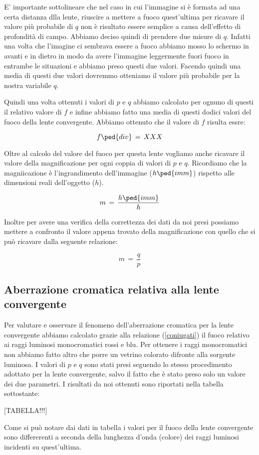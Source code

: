 E' importante sottolineare che nel caso in cui l'immagine si è formata ad una certa distanza dlla lente, riuscire a mettere a fuoco quest'ultima per ricavare il valore più probabile di $q$ non è risultato essere semplice a causa dell'effetto di profondità di campo. Abbiamo deciso quindi di prendere due misure di $q$. Infatti una volta che l'imagine ci sembrava essere a fuoco abbiamo mosso lo schermo in avanti e in dietro in modo da avere l'immagine leggermente fuori fuoco in entrambe le situazioni e abbiamo preso questi due valori. Facendo quindi una media di questi due valori dovremmo otteniamo il valore più probabile per la nostra variabile $q$.

Quindi una volta ottenuti i valori  di $p$ e $q$ abbiamo calcolato per ognuno di questi il relativo valore di $f$ e infine abbiamo fatto una media di questi dodici valori del fuoco della lente convergente.
Abbiamo ottenuto che il valore di $f$ risulta essre:

\begin{equation}
	f \ped{div} \,=\, XXX
\end{equation}

Oltre al calcolo del valore del fuoco per questa lente vogliamo anche ricavare il valore della magnificazione per ogni coppia di valori di $p$ e $q$. Ricordiamo che la magniicazione è l'ingrandimento dell'immagine ($h \ped{imm}$) rispetto alle dimensioni reali dell'oggetto ($h$).

\begin{equation}
	m \,=\, \frac{h \ped{imm}}{h}
\end{equation}

Inoltre per avere una verifica della correttezza dei dati da noi presi possiamo mettere a confronto il valore appena trovato della magnificazione con quello che si può ricavare dalla seguente relazione:

\begin{equation}
	m \,=\, \frac{q}{p}
\end{equation} 

\subsection{Aberrazione cromatica relativa alla lente convergente}

Per valutare e osservare il fenomeno dell'aberrazione cromatica per la lente convergente abbiamo calcolato grazie alla relazione (\ref{coniugati}) il fuoco relativo ai raggi luminosi monocromatici rossi e blu. Per ottenere i raggi monocromatici non abbiamo fatto altro che porre un vetrino colorato difronte alla sorgente luminosa. I valori di $p$ e $q$ sono stati presi seguendo lo stesso procedimento adottato per la lente convergente, salvo il fatto che è stato preso solo un valore dei due parametri.
I risultati da noi ottenuti sono riportati nella tabella sottostante:

[TABELLA!!!]

Come si può notare dai dati in tabella i valori per il fuoco della lente convergente sono differerenti a seconda della lunghezza d'onda (colore) dei raggi luminosi incidenti su quest'ultima. 









